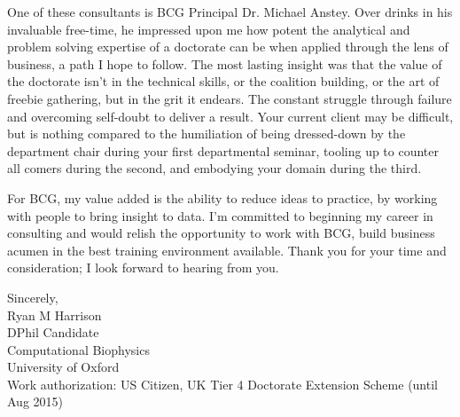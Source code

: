 \documentclass[a4paper]{../res}
\begin{document}
\begin{sloppypar}
\begin{resume}
One of these consultants is BCG Principal Dr. Michael Anstey. Over drinks in his invaluable free-time, he impressed upon me how potent the analytical and problem solving expertise of a doctorate can be when applied through the lens of business, a path I hope to follow. The most lasting insight was that the value of the doctorate isn't in the technical skills, or the coalition building, or the art of freebie gathering, but in the grit it endears. The constant struggle through failure and overcoming self-doubt to deliver a result. Your current client may be difficult, but is nothing compared to the humiliation of being dressed-down by the department chair during your first departmental seminar, tooling up to counter all comers during the second, and embodying your domain during the third.


For BCG, my value added is the ability to reduce ideas to practice, by working with people to bring insight to data. I'm committed to beginning my career in consulting and would relish the opportunity to work with BCG, build business acumen in the best training environment available. Thank you for your time and consideration; I look forward to hearing from you.



Sincerely, \\
Ryan M Harrison \\
DPhil Candidate \\
Computational Biophysics \\
University of Oxford  \\
Work authorization: US Citizen, UK Tier 4 Doctorate Extension Scheme (until Aug 2015)

\end{resume} 
\end{sloppypar}
\end{document}
